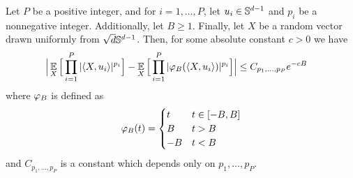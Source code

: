 \begin{lemma} \label{lemma:truncated_expectation}
Let $P$ be a positive integer, and for $i = 1, \ldots, P$, let $u_i \in \mathbb{S}^{d - 1}$ and $p_i$ be a nonnegative integer. Additionally, let $B \geq 1$. Finally, let $X$ be a random vector drawn uniformly from $\sqrt{d} \mathbb{S}^{d - 1}$. Then, for some absolute constant $c > 0$ we have
\begin{align}
\Big| \operatorname*{\mathbb{E}}_X \Big[ \prod_{i = 1}^P |\langle X, u_i \rangle|^{p_i} \Big] - \operatorname*{\mathbb{E}}_X \Big[ \prod_{i = 1}^P |{\varphi_B}(\langle X, u_i \rangle)|^{p_i} \Big] \Big| 
& \leq C_{p_1, \ldots, p_P} e^{-cB}
\end{align}
where ${\varphi_B}$ is defined as
\begin{align}
{\varphi_B}(t)
= \begin{cases}
t & t \in [-B, B] \\
B & t > B \\
-B & t < B
\end{cases}
\end{align}
and $C_{p_1, \ldots, p_P}$ is a constant which depends only on $p_1, \ldots, p_P$.
\end{lemma}
